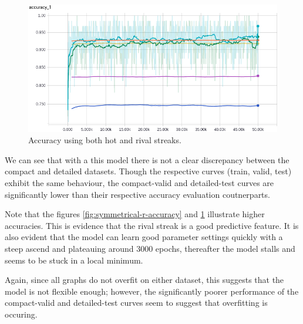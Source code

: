 \documentclass{article} %
\begin{document}
\begin{figure}[!htb]
\endminipage
{}%
  \includegraphics[width=\linewidth]{plots/model1/symmetrical/streak-hr/accuracy.png}
  \caption{Accuracy using both hot and rival streaks.}\label{fig:symmetrical-hr-accuracy}
\endminipage
\end{figure}

We can see that with a this model there is not a clear discrepancy between the compact and detailed datasets.
Though the respective curves (train, valid, test) exhibit the same behaviour, the compact-valid and detailed-test curves are significantly lower than their respective accuracy evaluation coutnerparts.

Note that the figures \ref{fig:symmetrical-r-accuracy} and \ref{fig:symmetrical-hr-accuracy} illustrate higher accuracies.  This is evidence that the rival streak is a good predictive feature.  It is also evident that the model can learn good parameter settings quickly with a steep ascend and plateauing around 3000 epochs, thereafter the model stalls and seems to be stuck in a local minimum.

Again, since all graphs do not overfit on either dataset, this suggests that the model is not flexible enough; however, the significantly poorer performance of the compact-valid and detailed-test curves seem to suggest that overfitting is occuring.
\end{document}
